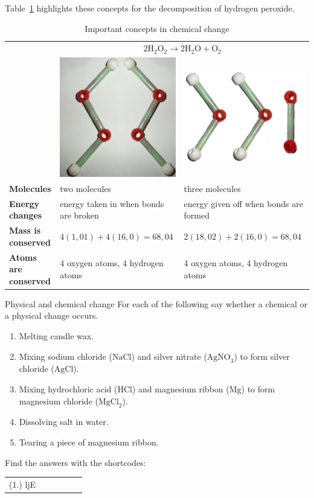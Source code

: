 Table~\ref{tab:chemchangeconcepts} highlights these concepts for the decomposition of hydrogen peroxide.
\begin{table}[H]
 \begin{center}
  \begin{tabular}{|l|l|l|} \hline
& \multicolumn{2}{|c|}{$2\text{H}_{2}\text{O}_{2} \rightarrow 2\text{H}_{2}\text{O} + \text{O}_{2}$} \\ 
& \includegraphics[width=.1\textwidth]{photos/H2O2_models.png} & \includegraphics[width=.1\textwidth]{photos/H2O_O2.png} \\ \hline
   \textbf{Molecules} & two molecules & three molecules \\ \hline
\textbf{Energy changes} & energy taken in when bonds are broken & energy given off when bonds are formed \\ \hline
\textbf{Mass is conserved} & $4(1,01) + 4(16,0) = 68,04$ & $2(18,02) + 2(16,0) = 68,04$ \\ \hline
\textbf{Atoms are conserved} & 4 oxygen atoms, 4 hydrogen atoms & 4 oxygen atoms, 4 hydrogen atoms \\ \hline
  \end{tabular}
 \end{center}
\caption{Important concepts in chemical change}
\label{tab:chemchangeconcepts}
\end{table}
\begin{exercises}{Physical and chemical change}
 For each of the following say whether a chemical or a physical change occurs.
\begin{enumerate}[noitemsep, label=\textbf{\arabic*}. ]
\item Melting candle wax.
\item Mixing sodium chloride ($\text{NaCl}$) and silver nitrate ($\text{AgNO}_3$) to form silver chloride ($\text{AgCl}$).
\item Mixing hydrochloric acid ($\text{HCl}$) and magnesium ribbon ($\text{Mg}$) to form magnesium chloride ($\text{MgCl}_{2}$).
\item Dissolving salt in water.
\item Tearing a piece of magnesium ribbon. 
\end{enumerate}
\practiceinfo
\par {} Find the answers with the shortcodes:
 \par \begin{tabular}[h]{cccccc}
 (1.) ljE  &    &   &   &    &   & \end{tabular}
\end{exercises}

